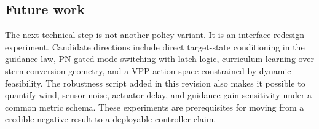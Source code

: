 \subsection{Future work}

The next technical step is not another policy variant. It is an interface redesign experiment. Candidate directions include direct target-state conditioning in the guidance law, PN-gated mode switching with latch logic, curriculum learning over stern-conversion geometry, and a VPP action space constrained by dynamic feasibility. The robustness script added in this revision also makes it possible to quantify wind, sensor noise, actuator delay, and guidance-gain sensitivity under a common metric schema. These experiments are prerequisites for moving from a credible negative result to a deployable controller claim.
